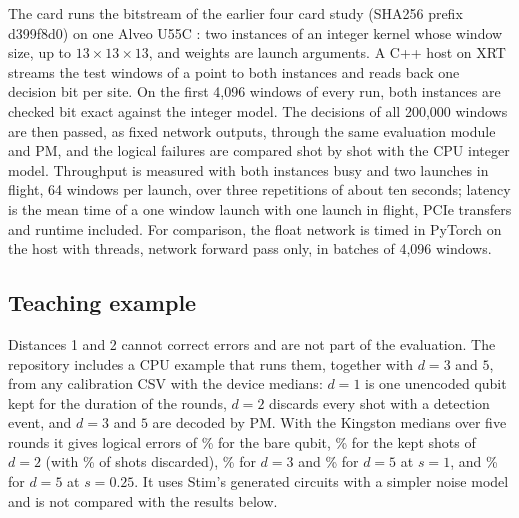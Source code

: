 The card runs the bitstream of the earlier four card study \cite{ali2026nodes} (SHA256 prefix d399f8d0) on one Alveo
U55C \cite{amd_ds978}: two instances of an integer kernel whose window size, up to $13 \times 13 \times 13$, and
weights are launch arguments. A C++ host on XRT \cite{amd_xrt} streams the test windows of a point to both instances
and reads back one decision bit per site. On the first 4,096 windows of every run, both instances are checked bit
exact against the integer model. The decisions of all 200,000 windows are then passed, as fixed network outputs,
through the same evaluation module and PM, and the logical failures are compared shot by shot with the CPU integer
model. Throughput is measured with both instances busy and two launches in flight, 64 windows per launch, over three
repetitions of about ten seconds; latency is the mean time of a one window launch with one launch in flight, PCIe
transfers and runtime included.
For comparison, the float network is timed in PyTorch on the \CpuName{} host with \CpuThreads{} threads, network
forward pass only, in batches of 4,096 windows.

\subsection{Teaching example}\label{sec:teaching}

Distances 1 and 2 cannot correct errors and are not part of the evaluation. The repository includes a CPU example
that runs them, together with $d = 3$ and $5$, from any calibration CSV with the device medians: $d = 1$ is one
unencoded qubit kept for the duration of the rounds, $d = 2$ discards every shot with a detection event, and $d = 3$
and $5$ are decoded by PM. With the Kingston medians over five rounds it gives logical errors of \TeachDOneOne\% for
the bare qubit, \TeachDTwoKeptOne\% for the kept shots of $d = 2$ (with \TeachDTwoDiscardOne\% of shots discarded),
\TeachDThreeOne\% for $d = 3$ and \TeachDFiveOne\% for $d = 5$ at $s = 1$, and \TeachDFiveQuarter\% for $d = 5$ at
$s = 0.25$. It uses Stim's generated circuits with a simpler noise model and is not compared with the results below.
